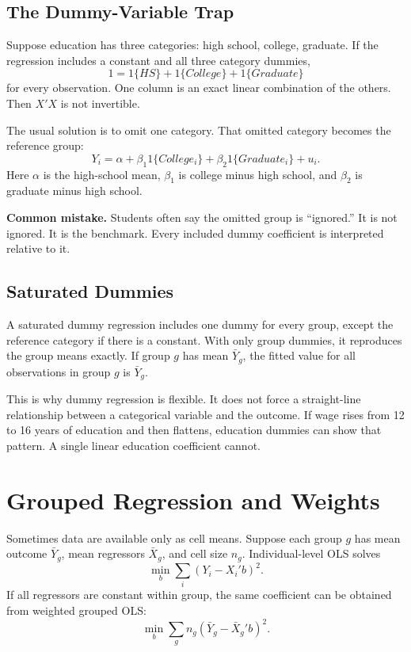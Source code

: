 \subsection{The Dummy-Variable Trap}

Suppose education has three categories: high school, college, graduate. If the
regression includes a constant and all three category dummies,
\[
  1 = 1\{HS\}+1\{College\}+1\{Graduate\}
\]
for every observation. One column is an exact linear combination of the
others. Then $X'X$ is not invertible.

The usual solution is to omit one category. That omitted category becomes the
reference group:
\[
  Y_i=\alpha+\beta_1 1\{College_i\}+\beta_2 1\{Graduate_i\}+u_i.
\]
Here $\alpha$ is the high-school mean, $\beta_1$ is college minus high school,
and $\beta_2$ is graduate minus high school.

\begin{boxF}
\textbf{Common mistake.} Students often say the omitted group is ``ignored.''
It is not ignored. It is the benchmark. Every included dummy coefficient is
interpreted relative to it.
\end{boxF}

\subsection{Saturated Dummies}

A saturated dummy regression includes one dummy for every group, except the
reference category if there is a constant. With only group dummies, it
reproduces the group means exactly. If group $g$ has mean $\bar Y_g$, the
fitted value for all observations in group $g$ is $\bar Y_g$.

This is why dummy regression is flexible. It does not force a straight-line
relationship between a categorical variable and the outcome. If wage rises
from 12 to 16 years of education and then flattens, education dummies can show
that pattern. A single linear education coefficient cannot.

\section{Grouped Regression and Weights}

Sometimes data are available only as cell means. Suppose each group $g$ has
mean outcome $\bar Y_g$, mean regressors $\bar X_g$, and cell size $n_g$.
Individual-level OLS solves
\[
  \min_b \sum_i (Y_i-X_i'b)^2.
\]
If all regressors are constant within group, the same coefficient can be
obtained from weighted grouped OLS:
\[
  \min_b \sum_g n_g(\bar Y_g-\bar X_g'b)^2.
\]

